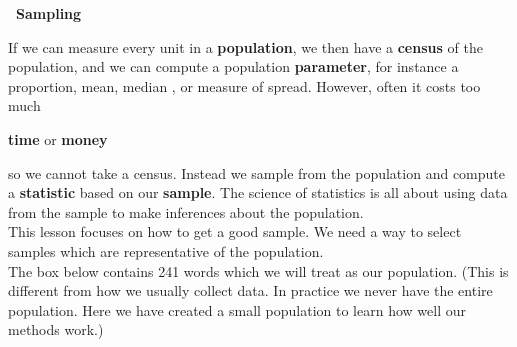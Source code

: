 \def\theTopic{Sampling }
\def\dayNum{3}

\begin{center}
{\large \bf\ Sampling}
\end{center}

If we can measure every unit in a {\bf population}, we then have a
{\bf census} of the population, and  we can 
compute a population {\bf parameter}, for instance a proportion, mean,
median , or measure of spread. However, often it costs too much
\vspace{-.4cm}
\begin{center}
  {\large\bf  time}\hspace{2cm} or\hspace{2cm} {\bf\large money}
\vspace{-.4cm}
\end{center}
      so we cannot take a census.  Instead we  sample from the
      population and compute a {\bf statistic} based on our {\bf
      sample}. The science of statistics is all about using data from
    the sample to make inferences about the population.\\
  This lesson focuses on how to  get a good sample.  We need a way to select
  samples which are representative of the population.
  \\
  The box below contains 241 words which we will treat as our
  population. (This is different from how we usually collect data. In
  practice we never have the entire population. Here we have created a 
  small population to learn how well our methods work.)  

